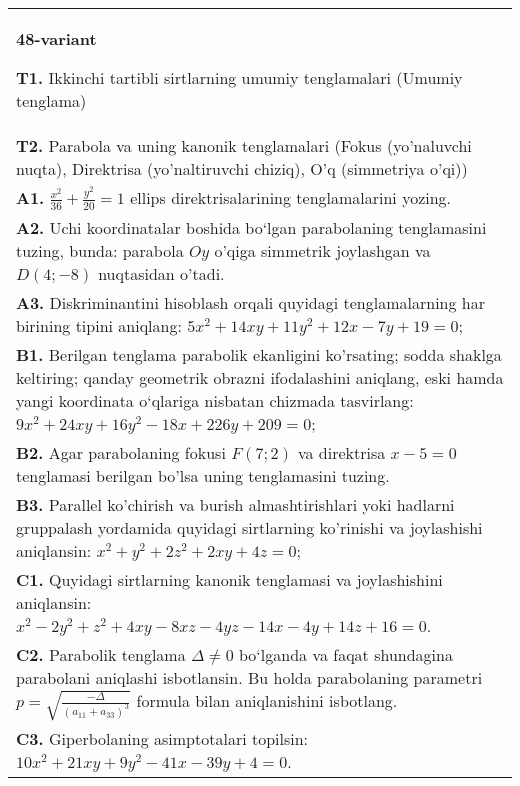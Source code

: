 \documentclass{article}
\begin{document}
\begin{tabular}{m{17cm}}
\textbf{48-variant}
\newline

\textbf{T1.} Ikkinchi tartibli sirtlarning umumiy tenglamalari (Umumiy tenglama) \\
\textbf{T2.} Parabola va uning kanonik tenglamalari (Fokus (yo’naluvchi nuqta), Direktrisa (yo’naltiruvchi chiziq), O’q (simmetriya o’qi)) \\
\textbf{A1.} $\frac{x^2}{36}+\frac{y^2}{20}=1$ ellips direktrisalarining tenglamalarini yozing. \\
\textbf{A2.} Uchi koordinatalar boshida bo‘lgan parabolaning tenglamasini tuzing, bunda: parabola $Oy$ o'qiga simmetrik joylashgan va $D(4 ;-8)$ nuqtasidan o’tadi. \\
\textbf{A3.} Diskriminantini hisoblash orqali quyidagi tenglamalarning har birining tipini aniqlang: $5 x^2+14 x y+11 y^2+12 x-7 y+19=0$; \\
\textbf{B1.} Berilgan tenglama parabolik ekanligini ko'rsating; sodda shaklga keltiring; qanday geometrik obrazni ifodalashini aniqlang, eski hamda yangi koordinata o‘qlariga nisbatan chizmada tasvirlang: $9 x^2+24 x y+16 y^2-18 x+226 y+209=0$; \\
\textbf{B2.} Agar parabolaning fokusi $F (7; 2) $ va direktrisa $x-5=0$ tenglamasi berilgan bo'lsa uning tenglamasini tuzing. \\
\textbf{B3.} Parallel ko'chirish va burish almashtirishlari yoki hadlarni gruppalash yordamida quyidagi sirtlarning ko'rinishi va joylashishi aniqlansin: $x^2+y^2+2 z^2+2 x y+4 z=0$; \\
\textbf{C1.} Quyidagi sirtlarning kanonik tenglamasi va joylashishini aniqlansin: $x^2-2 y^2+z^2+4 x y-8 x z-4 y z-14 x-4 y+14 z+16=0$. \\
\textbf{C2.} Parabolik tenglama $\Delta \neq 0$ bo‘lganda va faqat shundagina parabolani aniqlashi isbotlansin. Bu holda parabolaning parametri $p=\sqrt{\frac{-\Delta}{ (a_{11}+a_{33}) ^3}}$ formula bilan aniqlanishini isbotlang. \\
\textbf{C3.} Giperbolaning asimptotalari topilsin: $10 x^2+21 x y+9 y^2-41 x-39 y+4=0$. \\

\end{tabular}
\vspace{1cm}
\end{document}
